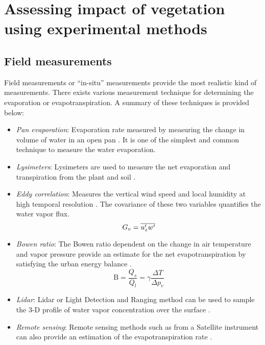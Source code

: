 %
%
%


\section{Assessing impact of vegetation using experimental methods}

\subsection{Field measurements}
Field measurements or ``in-situ'' measurements provide the most realistic kind of measurements. There exists various measurement technique for determining the evaporation or evapotranspiration. A summary of these techniques is provided below:

\begin{itemize}
	\item \textit{Pan evaporation}: Evaporation rate measured by measuring the change in volume of water in an open pan \citep{Finnigan1979, crowell2000guidelines, Farquhar2007, abtew2012evaporation}. It is one of the simplest and common technique to measure the water evaporation. 
	\item \textit{Lysimeters}: Lysimeters are used to measure the net evaporation and transpiration from the plant and soil \citep{Abtew1996,abtew2012evaporation}. 
	\item \textit{Eddy correlation}: Measures the vertical wind speed and local humidity at high temporal resolution \citep{German2000, shuttleworth1993evaporation}. The covariance of these two variables quantifies the water vapor flux.
		\begin{equation}
		G_v = \overline{u_z'w'}
		\end{equation}
	\item \textit{Bowen ratio}: The Bowen ratio dependent on the change in air temperature and vapor pressure provide an estimate for the net evapotranspiration by satisfying the urban energy balance \citep{Chen2006,Thom1975,DosReis1998,abtew2012evaporation,Deardorff1978}.
		\begin{equation}
		\mathrm{B} = \frac{Q_s}{Q_l} = \gamma \frac{\Delta T}{\Delta p_v}  
		\end{equation}
	\item \textit{Lidar}: Lidar or Light Detection and Ranging method can be used to sample the 3-D profile of water vapor concentration over the surface \citep{abtew2012evaporation,Idso1977}. 
	\item \textit{Remote sensing}: Remote sensing methods such as from a Satellite instrument can also provide an estimation of the evapotranspiration rate \citep{Kustas1990,Melesse2008,Melesse2009,abtew2012evaporation}. 
\end{itemize}


